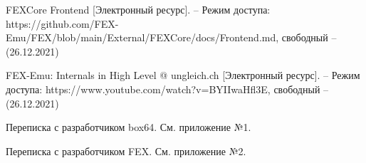 \begin{thebibliography}{}
	FEXCore Frontend [Электронный ресурс]. -- Режим доступа: 	https://github.com/FEX-Emu/FEX/blob/main/External/FEXCore/docs/Frontend.md,
	свободный -- (26.12.2021)
	
	 FEX-Emu: Internals in High Level @ ungleich.ch [Электронный ресурс]. -- Режим доступа: 		https://www.youtube.com/watch?v=BYIIwaHfl3E,
	 свободный -- (26.12.2021)

	Переписка с разработчиком box64. См. приложение №1.
	
	Переписка с разработчиком FEX. См. приложение №2.
	
\end{thebibliography}
\endgroup

\pagebreak